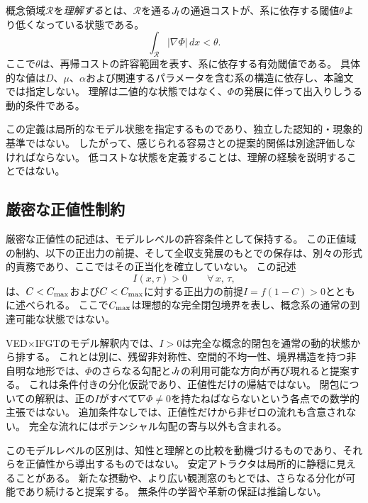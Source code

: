 \begin{definition}[理解]
概念領域$\mathcal{R}$を\emph{理解する}とは、$\mathcal{R}$を通る$J_{\!I}$の通過コストが、系に依存する閾値$\theta$より低くなっている状態である。
\begin{equation}
  \int_{\mathcal{R}} |\nabla\Phi|\,dx < \theta.
  \label{eq:understanding}
\end{equation}
ここで$\theta$は、再帰コストの許容範囲を表す、系に依存する有効閾値である。
具体的な値は$D$、$\mu$、$\alpha$および関連するパラメータを含む系の構造に依存し、本論文では指定しない。
理解は二値的な状態ではなく、$\Phi$の発展に伴って出入りしうる動的条件である。
\end{definition}

この定義は局所的なモデル状態を指定するものであり、独立した認知的・現象的基準ではない。
したがって、感じられる容易さとの提案的関係は別途評価しなければならない。
低コストな状態を定義することは、理解の経験を説明することではない。

\subsection{厳密な正値性制約}
厳密な正値性の記述は、モデルレベルの許容条件として保持する。
この正値域の制約、以下の正出力の前提、そして全収支発展のもとでの保存は、別々の形式的責務であり、ここではその正当化を確立していない。
この記述
\begin{equation}
  \boxed{I(x,\tau) > 0 \qquad \forall\,x,\,\tau,}
  \label{eq:positivity}
\end{equation}
は、$C < C_{\max}$および$C < C_{\max}$に対する正出力の前提$I = f(1-C) > 0$とともに述べられる。
ここで$C_{\max}$は理想的な完全閉包境界を表し、概念系の通常の到達可能な状態ではない。

\begin{proposition}[通常の完全な概念的閉包の不在]
VED$\times$IFGTのモデル解釈内では、$I>0$は完全な概念的閉包を通常の動的状態から排する。
これとは別に、残留非対称性、空間的不均一性、境界構造を持つ非自明な地形では、$\Phi$のさらなる勾配と$J_{\!I}$の利用可能な方向が再び現れると提案する。
これは条件付きの分化仮説であり、正値性だけの帰結ではない。
閉包についての解釈は、正の$I$がすべて$\nabla\Phi\neq0$を持たねばならないという各点での数学的主張ではない。
追加条件なしでは、正値性だけから非ゼロの流れも含意されない。
完全な流れにはポテンシャル勾配の寄与以外も含まれる。
\end{proposition}

\begin{remark}
このモデルレベルの区別は、知性と理解との比較を動機づけるものであり、それらを正値性から導出するものではない。
安定アトラクタは局所的に静穏に見えることがある。
新たな摂動や、より広い観測窓のもとでは、さらなる分化が可能であり続けると提案する。
無条件の学習や革新の保証は推論しない。
\end{remark}
